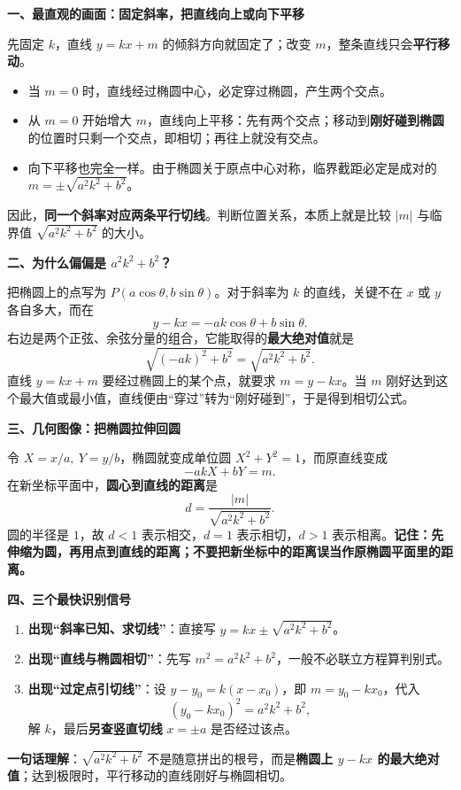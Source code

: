 \begin{explanationbox}
\textbf{一、最直观的画面：固定斜率，把直线向上或向下平移}\par
先固定 $k$，直线 $y=kx+m$ 的倾斜方向就固定了；改变 $m$，整条直线只会\textbf{平行移动}。
\begin{itemize}
    \item 当 $m=0$ 时，直线经过椭圆中心，必定穿过椭圆，产生两个交点。
    \item 从 $m=0$ 开始增大 $m$，直线向上平移：先有两个交点；移动到\textbf{刚好碰到椭圆}的位置时只剩一个交点，即相切；再往上就没有交点。
    \item 向下平移也完全一样。由于椭圆关于原点中心对称，临界截距必定是成对的 $m=\pm\sqrt{a^2k^2+b^2}$。
\end{itemize}
因此，\textbf{同一个斜率对应两条平行切线}。判断位置关系，本质上就是比较 $|m|$ 与临界值 $\sqrt{a^2k^2+b^2}$ 的大小。

\medskip
\textbf{二、为什么偏偏是 $a^2k^2+b^2$？}\par
把椭圆上的点写为 $P(a\cos\theta,b\sin\theta)$。对于斜率为 $k$ 的直线，关键不在 $x$ 或 $y$ 各自多大，而在
\[
y-kx=-ak\cos\theta+b\sin\theta.
\]
右边是两个正弦、余弦分量的组合，它能取得的\textbf{最大绝对值}就是
\[
\sqrt{(-ak)^2+b^2}=\sqrt{a^2k^2+b^2}.
\]
直线 $y=kx+m$ 要经过椭圆上的某个点，就要求 $m=y-kx$。当 $m$ 刚好达到这个最大值或最小值，直线便由“穿过”转为“刚好碰到”，于是得到相切公式。

\medskip
\textbf{三、几何图像：把椭圆拉伸回圆}\par
令 $X=x/a,\ Y=y/b$，椭圆就变成单位圆 $X^2+Y^2=1$，而原直线变成
\[
-akX+bY=m.
\]
在新坐标平面中，\textbf{圆心到直线的距离}是
\[
d=\frac{|m|}{\sqrt{a^2k^2+b^2}}.
\]
圆的半径是 $1$，故 $d<1$ 表示相交，$d=1$ 表示相切，$d>1$ 表示相离。\textbf{记住：先伸缩为圆，再用点到直线的距离；不要把新坐标中的距离误当作原椭圆平面里的距离。}

\medskip
\textbf{四、三个最快识别信号}\par
\begin{enumerate}
    \item \textbf{出现“斜率已知、求切线”}：直接写 $y=kx\pm\sqrt{a^2k^2+b^2}$。
    \item \textbf{出现“直线与椭圆相切”}：先写 $m^2=a^2k^2+b^2$，一般不必联立方程算判别式。
    \item \textbf{出现“过定点引切线”}：设 $y-y_0=k(x-x_0)$，即 $m=y_0-kx_0$，代入
    \[
    (y_0-kx_0)^2=a^2k^2+b^2,
    \]
    解 $k$，最后\textbf{另查竖直切线} $x=\pm a$ 是否经过该点。
\end{enumerate}

\textbf{一句话理解}：$\sqrt{a^2k^2+b^2}$ 不是随意拼出的根号，而是\textbf{椭圆上 $y-kx$ 的最大绝对值}；达到极限时，平行移动的直线刚好与椭圆相切。
\end{explanationbox}

